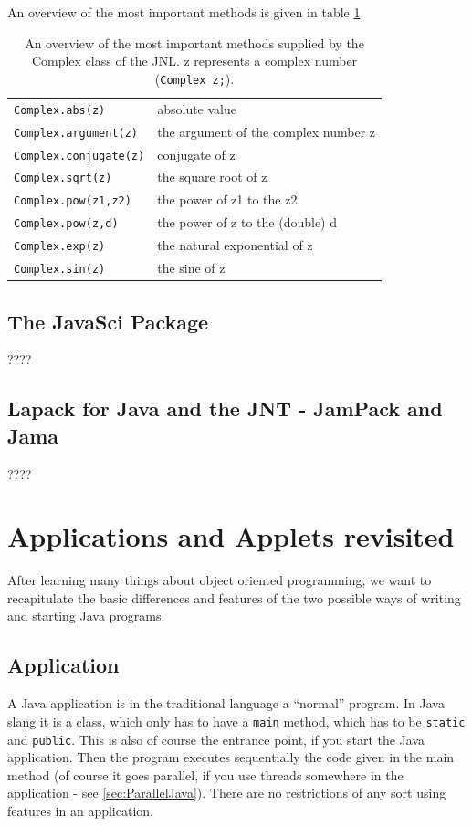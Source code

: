 An overview of the most important methods is given in table 
\ref{tab:JNLComplex}.
\begin{table}[htbp]
  \begin{center}
    \begin{tabular}{l|l}
      \verb|Complex.abs(z)| & absolute value \\
      \verb|Complex.argument(z)| & the argument of the complex number z \\
      \verb|Complex.conjugate(z)| & conjugate of z  \\
      \verb|Complex.sqrt(z)| & the square root of z \\
      \verb|Complex.pow(z1,z2)| & the power of z1 to the z2\\
      \verb|Complex.pow(z,d)| & the power of z to the (double) d\\
      \verb|Complex.exp(z)| & the natural exponential of z \\
      \verb|Complex.sin(z)| & the sine of z \\
    \end{tabular}
    \caption{An overview of the most important methods supplied by the 
      Complex class of the JNL. z represents a complex number 
      (\texttt{Complex z;}).}
    \label{tab:JNLComplex}
  \end{center}
\end{table}


\subsection{The JavaSci Package}
????

\subsection{Lapack for Java and the JNT - JamPack and Jama}
????



\section{Applications and Applets revisited}

After learning many things about object oriented programming,
we want to recapitulate the basic differences and features of
the two possible ways of writing and starting Java programs.

\subsection{Application}
A Java application is in the traditional language a ``normal'' program.
In Java slang it is a class, which only has to have a \verb|main|
method, which has to be \verb|static| and \verb|public|. This is also of course the
entrance point, if you start the Java application. Then the program
executes sequentially the code given in the main method (of course it
goes parallel, if you use threads somewhere in the application - see
\ref{sec:ParallelJava}). There are no restrictions of any sort using
features in an application.


